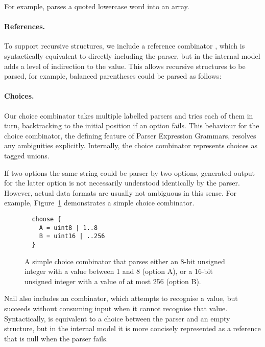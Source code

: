 For example,  parses a quoted
lowercase word into an array.

\paragraph{References.}
To support recursive structures, we include a reference combinator \cc{*}, which is
syntactically equivalent to directly including the parser, but in the internal model adds a level of
indirection to the value. This allows recursive structures to be parsed, for example, balanced
parentheses could be parsed as follows: 

\paragraph{Choices.}
Our choice combinator takes multiple labelled parsers and tries each of them in turn, backtracking
to the initial position if an option fails. This behaviour for the choice combinator, the defining
feature of Parser Expression Grammars\cite{ford2002packrat}, resolves any ambiguities explicitly.
Internally, the choice combinator represents choices as tagged unions. 

If two options the same string could be parser by two options, generated output for the latter
option is not necessarily understood identically by the parser. However, actual data formats are
usually not ambiguous in this sense.
For example, Figure~\ref{fig:choice} demonstrates a simple choice
combinator.

\begin{figure}[h!]
\smaller[0.5]
\begin{verbatim}
  choose {
    A = uint8 | 1..8
    B = uint16 | ..256
  }
\end{verbatim}
\caption{A simple choice combinator that parses either an 8-bit unsigned
integer with a value between 1 and 8 (option A), or a 16-bit unsigned
integer with a value of at most 256 (option B).}
\label{fig:choice}
\end{figure}

Nail also includes an  combinator, which attempts to recognise a value, but succeeds
without consuming input when it cannot recognise that value. Syntactically,  is
equivalent to a choice between the parser and an empty structure, but in the internal model it is
more concisely represented as a reference that is null when the parser fails.



